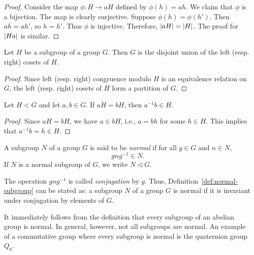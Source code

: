 \begin{proof}
    Consider the map \(\phi: H \to aH\) defined by \(\phi(h) = ah\). We claim that \(\phi\) is a bijection. The map is clearly surjective. Suppose \(\phi(h) = \phi(h')\). Then \(ah = ah'\), so \(h = h'\). Thus \(\phi\) is injective. Therefore, \(\lvert aH \rvert = \lvert H \rvert\). The proof for \(\lvert Ha \rvert\) is similar.
\end{proof}

\begin{theorem}
    Let \(H\) be a subgroup of a group \(G\). Then \(G\) is the disjoint union of the left (resp. right) cosets of \(H\).
\end{theorem}

\begin{proof}
    Since left (resp. right) congruence modulo \(H\) is an equivalence relation on \(G\), the left (resp. right) cosets of \(H\) form a partition of \(G\).
\end{proof}


\begin{theorem}
    Let \(H < G\) and let \(a, b \in G\). If \(aH = bH\), then \(a^{-1}b \in H\).
\end{theorem}

\begin{proof}
    Since \(aH = bH\), we have \(a \in bH\), i.e., \(a = bh\) for some \(h \in H\). This implies that \(a^{-1}b = h \in H\).
\end{proof}

\begin{definition}
    \label{def:normal-subgroup}
    A subgroup \(N\) of a group \(G\) is said to be \emph{normal} if for all \(g \in G\) and \(n \in N\),
    \[
        gng^{-1} \in N.
    \]
    If \(N\) is a normal subgroup of \(G\), we write \(N \triangleleft G\).
\end{definition}

\begin{remark}
    The operation \(gng^{-1}\) is called \emph{conjugation} by \(g\). Thus, Definition~\ref{def:normal-subgroup} can be stated as: a subgroup \(N\) of a group \(G\) is normal if it is invariant under conjugation by elements of \(G\).
\end{remark}

\begin{example}
    It immediately follows from the definition that every subgroup of an abelian group is normal. In general, however, not all subgroups are normal. An example of a commutative group where every subgroup is normal is the quaternion group \(Q_8\).
\end{example}

